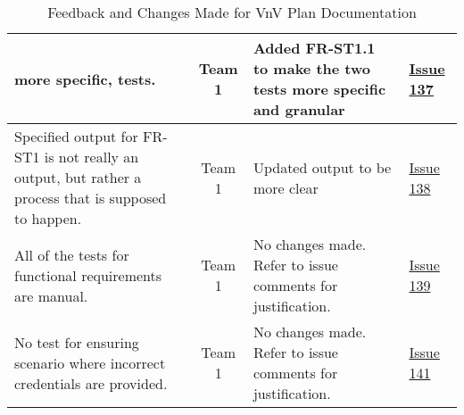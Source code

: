 \documentclass{article}
\begin{document}
\begin{table}[H]
\begin{tabularx}{\textwidth}{|X|c|X|p{1.5cm}|}
    more specific, tests. & Team 1 & Added FR-ST1.1 to make the two tests more
    specific and granular &
    \href{https://github.com/SumanyaG/Alkalytics/issues/137}{Issue 137} \\
    \hline
    Specified output for FR-ST1 is not really an output, but rather a process
    that is supposed to happen. & Team 1 & Updated output to be more clear &
    \href{https://github.com/SumanyaG/Alkalytics/issues/138}{Issue 138} \\
    \hline
    All of the tests for functional requirements are manual. & Team 1 & No
    changes made. Refer to issue comments for justification. &
    \href{https://github.com/SumanyaG/Alkalytics/issues/139}{Issue 139} \\
    \hline
    No test for ensuring scenario where incorrect credentials are provided. &
    Team 1 & No changes made. Refer to issue comments for justification. &
    \href{https://github.com/SumanyaG/Alkalytics/issues/141}{Issue 141} \\
    \hline
\end{tabularx}
\caption{Feedback and Changes Made for VnV Plan Documentation}
\label{table:VnV1}
\end{table}
\end{document}
